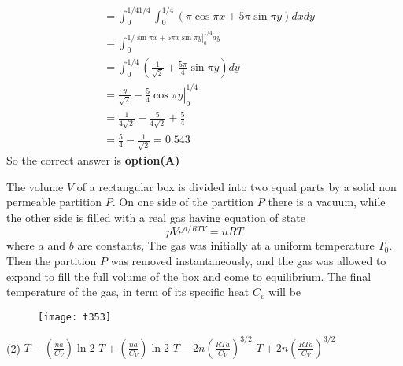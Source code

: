 \begin{questions}
\begin{answer}
	$$
	\begin{aligned}
	&=\int_{0}^{1 / 41 / 4} \int_{0}^{1 / 4}(\pi \cos \pi x+5 \pi \sin \pi y) d x d y \\
	&=\int_{0}^{1 / \sin \pi x+\left.5 \pi x \sin \pi y\right|_{0} ^{1 / 4} d y} \\
	&=\int_{0}^{1 / 4}\left(\frac{1}{\sqrt{2}}+\frac{5 \pi}{4} \sin \pi y\right) d y \\
	&=\frac{y}{\sqrt{2}}-\left.\frac{5}{4} \cos \pi y\right|_{0} ^{1 / 4} \\
	&=\frac{1}{4 \sqrt{2}}-\frac{5}{4 \sqrt{2}}+\frac{5}{4} \\
	&=\frac{5}{4}-\frac{1}{\sqrt{2}}=0.543
	\end{aligned}
	$$
	So the correct answer is \textbf{option(A)}
\end{answer}
\begin{minipage}{\textwidth}
	\question The volume $V$ of a rectangular box is divided into two equal parts by a solid non permeable partition $P$. On one side of the partition $P$ there is a vacuum, while the other side is filled with a real gas having equation of state
	$$
	p V e^{a / R T V}=n R T
	$$
	where $a$ and $b$ are constants, The gas was initially at a uniform temperature $T_{0}$. Then the partition $P$ was removed instantaneously, and the gas was allowed to expand to fill the full volume of the box and come to equilibrium. The final temperature of the gas, in term of its specific heat $C_{v}$ will be
\end{minipage}
\begin{figure}[H]
	\centering
	\texttt{[image: t353]}
\end{figure}
\begin{tasks}(2)
	\task[\textbf{A.}] $T-\left(\frac{n a}{C_{V}}\right) \ln 2$
	\task[\textbf{B.}] $T+\left(\frac{n a}{C_{V}}\right) \ln 2$
	\task[\textbf{C.}]   $T-2 n\left(\frac{R T a}{C_{V}}\right)^{3 / 2}$
	\task[\textbf{D.}] $T+2 n\left(\frac{R T a}{C_{V}}\right)^{3 / 2}$
\end{tasks}
\begin{answer}
	

\end{answer}
\end{questions}

